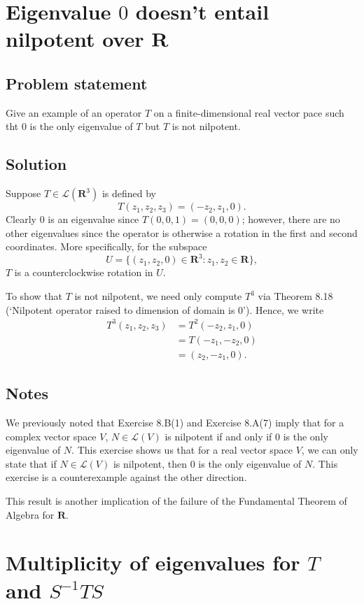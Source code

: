 \documentclass{article}
\begin{document}
\clearpage

\section{Eigenvalue $0$ doesn't entail nilpotent over $\mathbf{R}$}
\subsection*{Problem statement}
Give an example of an operator $T$ on a finite-dimensional real vector pace such tht $0$ is the only eigenvalue of $T$ but $T$ is not nilpotent.

\subsection*{Solution}
Suppose $T\in\mathcal{L}(\mathbf{R}^3)$ is defined by
\[T(z_1,z_2,z_3)=(-z_2,z_1,0).\]
Clearly $0$ is an eigenvalue since $T(0,0,1)=(0,0,0)$; however, there are no other eigenvalues since the operator is otherwise a rotation in the first and second coordinates. More specifically, for the subspace 
\[U=\{(z_1,z_2,0)\in\mathbf{R}^3:z_1,z_2\in\mathbf{R}\},\] 
$T$ is a counterclockwise rotation in $U$.

To show that $T$ is not nilpotent, we need only compute $T^3$ via Theorem 8.18 (`Nilpotent operator raised to dimension of domain is $0$'). Hence, we write
\begin{align*}
    T^3(z_1,z_2,z_3)&=T^2(-z_2,z_1,0)\\
    &=T(-z_1,-z_2,0)\\
    &=(z_2,-z_1,0).
\end{align*}

\subsection*{Notes}
We previously noted that Exercise 8.B(1) and Exercise 8.A(7) imply that for a complex vector space $V$, $N\in\mathcal{L}(V)$ is nilpotent if and only if $0$ is the only eigenvalue of $N$. This exercise shows us that for a real vector space $V$, we can only state that if $N\in\mathcal{L}(V)$ is nilpotent, then $0$ is the only eigenvalue of $N$. This exercise is a counterexample against the other direction.

This result is another implication of the failure of the Fundamental Theorem of Algebra for $\mathbf{R}$.

\clearpage

\section{Multiplicity of eigenvalues for $T$ and $S^{-1}TS$}
\end{document}
